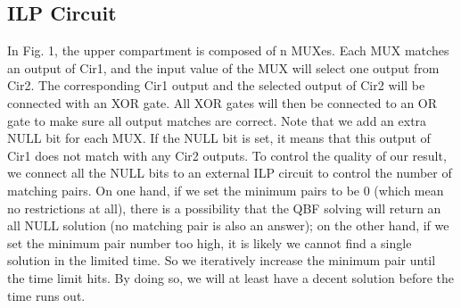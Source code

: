 \subsection{ILP Circuit}
In Fig. 1, the upper compartment is composed of n MUXes. Each MUX matches an output of Cir1, and the input value of the MUX will select one output from Cir2. The corresponding Cir1 output and the selected output of Cir2 will be connected with an XOR gate. All XOR gates will then be connected to an OR gate to make sure all output matches are correct. Note that we add an extra NULL bit for each MUX. If the NULL bit is set, it means that this output of Cir1 does not match with any Cir2 outputs.
To control the quality of our result, we connect all the NULL bits to an external ILP circuit to control the number of matching pairs. On one hand, if we set the minimum pairs to be 0 (which mean no restrictions at all), there is a possibility that the QBF solving will return an all NULL solution (no matching pair is also an answer); on the other hand, if we set the minimum pair number too high, it is likely we cannot find a single solution in the limited time. So we iteratively increase the minimum pair until the time limit hits. By doing so, we will at least have a decent solution before the time runs out.

